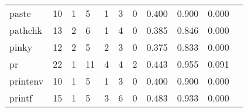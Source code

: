 \begin{longtable}{lp{1.20cm}p{1.20cm}p{1.20cm}p{1.20cm}p{1.20cm}p{1.20cm}p{1.20cm}p{1.20cm}p{1.20cm}p{1.20cm}}
paste     &                                    10 &                                                  1 &                                                  5 &                                                  1 &                                                  3 &                                                  0 &                                         0.400 &                                              0.900 &                                              0.000 \\
pathchk   &                                    13 &                                                  2 &                                                  6 &                                                  1 &                                                  4 &                                                  0 &                                         0.385 &                                              0.846 &                                              0.000 \\
pinky     &                                    12 &                                                  2 &                                                  5 &                                                  2 &                                                  3 &                                                  0 &                                         0.375 &                                              0.833 &                                              0.000 \\
pr        &                                    22 &                                                  1 &                                                 11 &                                                  4 &                                                  4 &                                                  2 &                                         0.443 &                                              0.955 &                                              0.091 \\
printenv  &                                    10 &                                                  1 &                                                  5 &                                                  1 &                                                  3 &                                                  0 &                                         0.400 &                                              0.900 &                                              0.000 \\
printf    &                                    15 &                                                  1 &                                                  5 &                                                  3 &                                                  6 &                                                  0 &                                         0.483 &                                              0.933 &                                              0.000 \\

\end{longtable}
